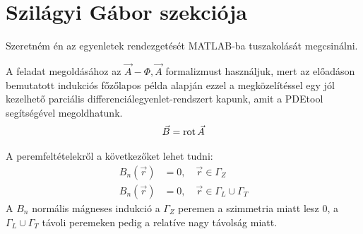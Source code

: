\section{Szilágyi Gábor szekciója}
Szeretném én az egyenletek rendezgetését MATLAB-ba tuszakolását megcsinálni.

A feladat megoldásához az $\vec{A}-\Phi, \vec{A}$ formalizmust használjuk, mert az előadáson bemutatott indukciós főzőlapos példa alapján ezzel a megközelítéssel egy jól kezelhető parciális differenciálegyenlet-rendszert kapunk, amit a PDEtool segítségével megoldhatunk.
\begin{align}
    \vec{B} = \operatorname{rot} \vec{A}
\end{align}

A peremfeltételekről a következőket lehet tudni:
\begin{align}
    B_n(\vec{r}) &= 0, \quad \vec{r} \in \Gamma_Z\\
    B_n(\vec{r}) &= 0, \quad \vec{r} \in \Gamma_L \cup \Gamma_T
\end{align}
A $B_n$ normális mágneses indukció a $\Gamma_Z$ peremen a szimmetria miatt lesz 0, a $\Gamma_L \cup \Gamma_T$ távoli peremeken pedig a relatíve nagy távolság miatt.
